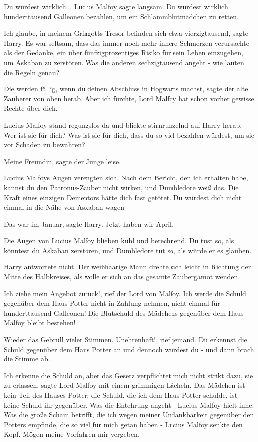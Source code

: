 \glqq{}Du würdest wirklich...\grqq{} Lucius Malfoy sagte langsam. \glqq{}Du
würdest wirklich hunderttausend Galleonen bezahlen, um ein Schlammblutmädchen zu
retten.\grqq{}

\glqq{}Ich glaube, in meinem Gringotts-Tresor befinden sich etwa
vierzigtausend\grqq{}, sagte Harry. Es war seltsam, dass das immer noch mehr
innere Schmerzen verursachte als der Gedanke, ein über fünfzigprozentiges Risiko
für sein Leben einzugehen, um Askaban zu zerstören. \glqq{}Was die anderen
sechzigtausend angeht - wie lauten die Regeln genau?\grqq{}

\glqq{}Die werden fällig, wenn du deinen Abschluss in Hogwarts machst\grqq{},
sagte der alte Zauberer von oben herab. \glqq{}Aber ich fürchte, Lord Malfoy hat
schon vorher gewisse Rechte über dich.\grqq{}

Lucius Malfoy stand regungslos da und blickte stirnrunzelnd auf Harry herab.
\glqq{}Wer ist sie für dich? Was ist sie für dich, dass du so viel bezahlen
würdest, um sie vor Schaden zu bewahren?\grqq{}

\glqq{}Meine Freundin\grqq{}, sagte der Junge leise.

Lucius Malfoys Augen verengten sich. \glqq{}Nach dem Bericht, den ich erhalten
habe, kannst du den Patronus-Zauber nicht wirken, und Dumbledore weiß das. Die
Kraft eines einzigen Dementors hätte dich fast getötet. Du würdest dich nicht
einmal in die Nähe von Askaban wagen -\grqq{}

\glqq{}Das war im Januar\grqq{}, sagte Harry. \glqq{}Jetzt haben wir April.\grqq{}

Die Augen von Lucius Malfoy blieben kühl und berechnend. \glqq{}Du tust so, als
könntest du Askaban zerstören, und Dumbledore tut so, als würde er es
glauben.\grqq{}

Harry antwortete nicht. Der weißhaarige Mann drehte sich leicht in Richtung der
Mitte des Halbkreises, als wolle er sich an das gesamte Zaubergamot wenden.

\glqq{}Ich ziehe mein Angebot zurück!\grqq{}, rief der Lord von Malfoy. \glqq{}Ich
werde die Schuld gegenüber dem Haus Potter nicht in Zahlung nehmen, nicht einmal
für hunderttausend Galleonen! Die Blutschuld des Mädchens gegenüber dem Haus
Malfoy bleibt bestehen!\grqq{}

Wieder das Gebrüll vieler Stimmen. \glqq{}Unehrenhaft!\grqq{}, rief jemand. \glqq{}
Du erkennst die Schuld gegenüber dem Haus Potter an und dennoch würdest du
-\grqq{} und dann brach die Stimme ab.

\glqq{}Ich erkenne die Schuld an, aber das Gesetz verpflichtet mich nicht strikt
dazu, sie zu erlassen\grqq{}, sagte Lord Malfoy mit einem grimmigen Lächeln.
\glqq{}Das Mädchen ist kein Teil des Hauses Potter; die Schuld, die ich dem Haus
Potter schulde, ist keine Schuld ihr gegenüber. Was die Entehrung angeht
-\grqq{} Lucius Malfoy hielt inne. \glqq{}Was die große Scham betrifft, die ich
wegen meiner Undankbarkeit gegenüber den Potters empfinde, die so viel für mich
getan haben -\grqq{} Lucius Malfoy senkte den Kopf. \glqq{}Mögen meine Vorfahren
mir vergeben.\grqq{}

